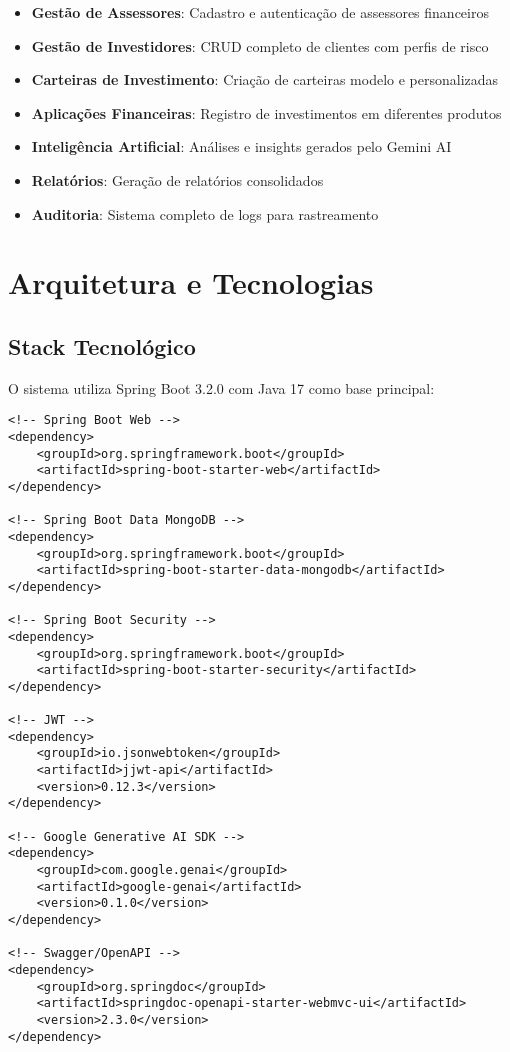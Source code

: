 \documentclass[12pt,a4paper]{article}
\begin{document}
\begin{itemize}[leftmargin=*]
    \item \textbf{Gestão de Assessores}: Cadastro e autenticação de assessores financeiros
    \item \textbf{Gestão de Investidores}: CRUD completo de clientes com perfis de risco
    \item \textbf{Carteiras de Investimento}: Criação de carteiras modelo e personalizadas
    \item \textbf{Aplicações Financeiras}: Registro de investimentos em diferentes produtos
    \item \textbf{Inteligência Artificial}: Análises e insights gerados pelo Gemini AI
    \item \textbf{Relatórios}: Geração de relatórios consolidados
    \item \textbf{Auditoria}: Sistema completo de logs para rastreamento
\end{itemize}

\section{Arquitetura e Tecnologias}

\subsection{Stack Tecnológico}

O sistema utiliza Spring Boot 3.2.0 com Java 17 como base principal:

\begin{lstlisting}[caption=Dependências principais do pom.xml]
<!-- Spring Boot Web -->
<dependency>
    <groupId>org.springframework.boot</groupId>
    <artifactId>spring-boot-starter-web</artifactId>
</dependency>

<!-- Spring Boot Data MongoDB -->
<dependency>
    <groupId>org.springframework.boot</groupId>
    <artifactId>spring-boot-starter-data-mongodb</artifactId>
</dependency>

<!-- Spring Boot Security -->
<dependency>
    <groupId>org.springframework.boot</groupId>
    <artifactId>spring-boot-starter-security</artifactId>
</dependency>

<!-- JWT -->
<dependency>
    <groupId>io.jsonwebtoken</groupId>
    <artifactId>jjwt-api</artifactId>
    <version>0.12.3</version>
</dependency>

<!-- Google Generative AI SDK -->
<dependency>
    <groupId>com.google.genai</groupId>
    <artifactId>google-genai</artifactId>
    <version>0.1.0</version>
</dependency>

<!-- Swagger/OpenAPI -->
<dependency>
    <groupId>org.springdoc</groupId>
    <artifactId>springdoc-openapi-starter-webmvc-ui</artifactId>
    <version>2.3.0</version>
</dependency>
\end{lstlisting}
\end{document}

